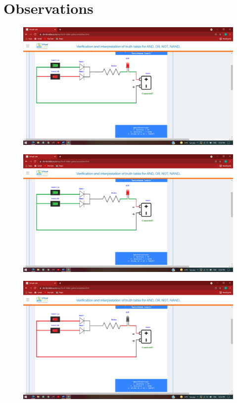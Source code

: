 \section{Observations}
	\begin{figure}[h]
		\centering
		\includegraphics[width=0.9\linewidth]{img/exp2/4}
		\caption{}
		\label{fig:2:4}
	\end{figure}
		\begin{figure}[h]
		\centering
		\includegraphics[width=0.9\linewidth]{img/exp2/5}
		\caption{}
		\label{fig:2:5}
	\end{figure}
		\begin{figure}[h]
		\centering
		\includegraphics[width=0.9\linewidth]{img/exp2/6}
		\caption{}
		\label{fig:2:6}
	\end{figure}
